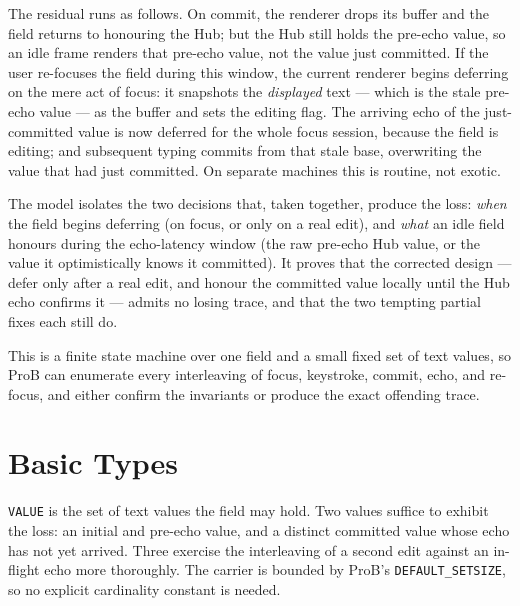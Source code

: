 \documentclass[a4paper,10pt,fleqn]{article}
\begin{document}
The residual runs as follows.  On commit, the renderer drops its buffer and the
field returns to honouring the Hub; but the Hub still holds the pre-echo value,
so an idle frame renders that pre-echo value, not the value just committed.  If
the user re-focuses the field during this window, the current renderer begins
deferring on the mere act of focus: it snapshots the \emph{displayed} text ---
which is the stale pre-echo value --- as the buffer and sets the editing flag.
The arriving echo of the just-committed value is now deferred for the whole
focus session, because the field is editing; and subsequent typing commits from
that stale base, overwriting the value that had just committed.  On separate
machines this is routine, not exotic.

The model isolates the two decisions that, taken together, produce the loss:
\emph{when} the field begins deferring (on focus, or only on a real edit), and
\emph{what} an idle field honours during the echo-latency window (the raw
pre-echo Hub value, or the value it optimistically knows it committed).  It
proves that the corrected design --- defer only after a real edit, and honour
the committed value locally until the Hub echo confirms it --- admits no losing
trace, and that the two tempting partial fixes each still do.

This is a finite state machine over one field and a small fixed set of text
values, so ProB can enumerate every interleaving of focus, keystroke, commit,
echo, and re-focus, and either confirm the invariants or produce the exact
offending trace.

\section{Basic Types}

\begin{zed}
  [VALUE]
\end{zed}

\texttt{VALUE} is the set of text values the field may hold.  Two values suffice
to exhibit the loss: an initial and pre-echo value, and a distinct committed
value whose echo has not yet arrived.  Three exercise the interleaving of a
second edit against an in-flight echo more thoroughly.  The carrier is bounded
by ProB's \texttt{DEFAULT\_SETSIZE}, so no explicit cardinality constant is
needed.

\end{document}
